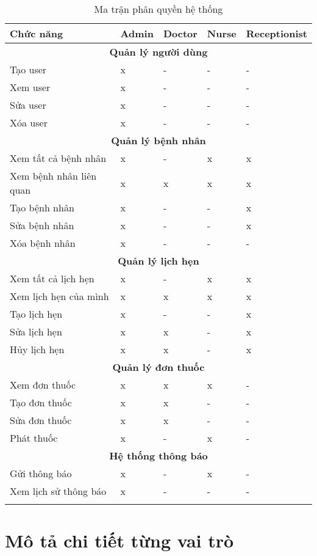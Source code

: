 \documentclass[12pt,a4paper]{report}
\begin{document}
\begin{longtable}{|p{3cm}|p{2cm}|p{2cm}|p{2cm}|p{2cm}|}
\hline
\textbf{Chức năng} & \textbf{Admin} & \textbf{Doctor} & \textbf{Nurse} & \textbf{Receptionist} \\
\hline
\multicolumn{5}{|c|}{\textbf{Quản lý người dùng}} \\
\hline
Tạo user & x & - & - & - \\
\hline
Xem user & x & - & - & - \\
\hline
Sửa user & x & - & - & - \\
\hline
Xóa user & x & - & - & - \\
\hline
\multicolumn{5}{|c|}{\textbf{Quản lý bệnh nhân}} \\
\hline
Xem tất cả bệnh nhân & x & - & x & x \\
\hline
Xem bệnh nhân liên quan & x & x & x & x \\
\hline
Tạo bệnh nhân & x & - & - & x \\
\hline
Sửa bệnh nhân & x & - & - & x \\
\hline
Xóa bệnh nhân & x & - & - & - \\
\hline
\multicolumn{5}{|c|}{\textbf{Quản lý lịch hẹn}} \\
\hline
Xem tất cả lịch hẹn & x & - & x & x \\
\hline
Xem lịch hẹn của mình & x & x & x & x \\
\hline
Tạo lịch hẹn & x & - & - & x \\
\hline
Sửa lịch hẹn & x & x & - & x \\
\hline
Hủy lịch hẹn & x & x & - & x \\
\hline
\multicolumn{5}{|c|}{\textbf{Quản lý đơn thuốc}} \\
\hline
Xem đơn thuốc & x & x & x & - \\
\hline
Tạo đơn thuốc & x & x & - & - \\
\hline
Sửa đơn thuốc & x & x & - & - \\
\hline
Phát thuốc & x & - & x & - \\
\hline
\multicolumn{5}{|c|}{\textbf{Hệ thống thông báo}} \\
\hline
Gửi thông báo & x & - & x & - \\
\hline
Xem lịch sử thông báo & x & - & - & - \\
\hline
\caption{Ma trận phân quyền hệ thống}
\end{longtable}

\section{Mô tả chi tiết từng vai trò}
\end{document}
